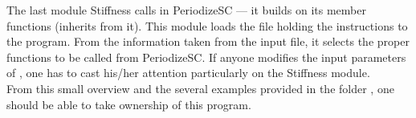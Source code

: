 \documentclass{article}
\begin{document}
The last module Stiffness calls in PeriodizeSC --- it builds on its member functions (inherits from it). This module loads the  file holding the instructions to the program. From the information taken from the input file, it selects the proper functions to be called from PeriodizeSC. If anyone modifies the input parameters of , one has to cast his/her attention particularly on the Stiffness module.\\

From this small overview and the several examples provided in the folder , one should be able to take ownership of this program.



\nocite{*}

 
%
\end{document}
